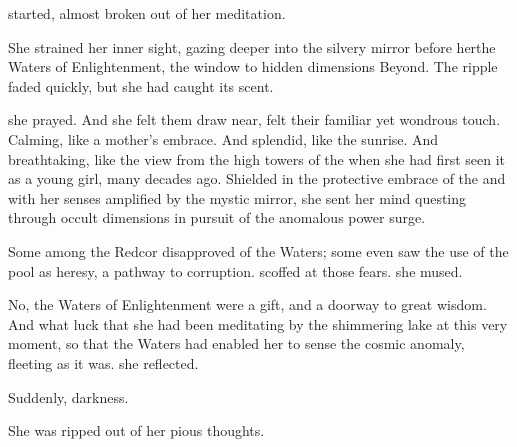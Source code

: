   \EsmerelFull{} started, almost broken out of her meditation. 


She strained her inner sight, gazing deeper into the silvery mirror before her\dash the Waters of Enlightenment, the window to hidden dimensions Beyond. The ripple faded quickly, but she had caught its scent. 

 she prayed. 
And she felt them draw near, felt their familiar yet wondrous touch. Calming, like a mother's embrace. And splendid, like the sunrise. And breathtaking, like the view from the high towers of the \TopazChateau{} when she had first seen it as a young girl, many decades ago. Shielded in the protective embrace of the \sephiroth{} and with her senses amplified by the mystic mirror, she sent her mind questing through occult dimensions in pursuit of the anomalous power surge. 

Some among the Redcor disapproved of the Waters; some even saw the use of the pool as heresy, a pathway to corruption. 
\Esmerel{} scoffed at those fears. 
 she mused. 

No, the Waters of Enlightenment were a gift, and a doorway to great wisdom. And what luck that she had been meditating by the shimmering lake at this very moment, so that the Waters had enabled her to sense the cosmic anomaly, fleeting as it was.  she reflected. 


Suddenly, darkness. 

She was ripped out of her pious thoughts. 

